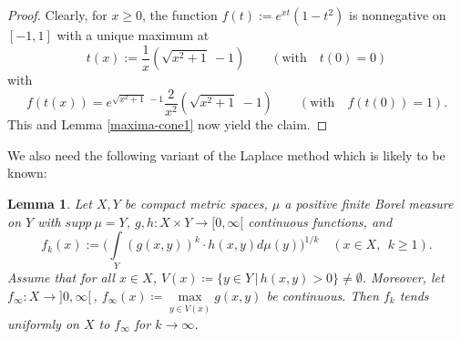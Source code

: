 \documentclass[reqno]{amsart}
\theoremstyle{plain}
\newtheorem{lemma}[theorem]{Lemma}
\theoremstyle{definition}
\numberwithin{equation}{section}
\begin{document}
\begin{proof} Clearly, for $x\ge0$, the function $f(t):=  e^{x t}(1-t^2)$  is nonnegative on $[-1,1]$ with a unique maximum at
  $$t(x):=\frac{1}{x}(\sqrt{x^2+1}\> -1) \quad\quad (\text{with}\quad t(0)=0) $$ with 
  $$f(t(x))=e^{\sqrt{ x^2+1}\> -1}\frac{2}{x^2}(\sqrt{x^2+1}\> -1) \quad\quad (\text{with}\quad f(t(0))=1).$$
This and Lemma \ref{maxima-cone1} now yield the claim.
  \end{proof}


We also need the following variant of the Laplace method which is likely to be known:


\begin{lemma}\label{Laplace-method-roots}
Let  $X,Y$ be compact metric spaces, $\mu$ a positive finite Borel measure on $Y$ with $supp\>\mu=Y$,
$g,h:X \times Y \to [0,\infty[$  continuous functions, and
$$f_k(x):= \Bigg( \int\limits_Y (g(x,y))^k \cdot h(x,y) d\mu(y) \Bigg)^{1/k} \quad (x\in X,\>\>k \ge 1 ).$$
 Assume that for
 all $x \in X$, $V(x) \coloneqq \{y \in Y \, | \, h(x,y)>0\}\ne\emptyset$.
Moreover, let $f_{\infty}:X \to ]0,\infty[\,$, $f_{\infty}(x) \coloneqq \max\limits_{y \in \overline{V(x)}} g(x,y)$ be continuous.
    Then $f_k$ tends uniformly on $X$ to $f_{\infty}$ for $k\to\infty$.
\end{lemma}
\end{document}
